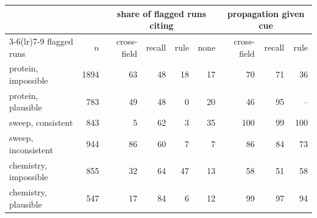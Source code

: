 \begin{tabular}{lrrrrrrrr}
\toprule
& & \multicolumn{4}{c}{share of flagged runs citing} & \multicolumn{3}{c}{propagation given cue} \\
\cmidrule(lr){3-6}\cmidrule(lr){7-9}
flagged runs & $n$ & cross-field & recall & rule & none & cross-field & recall & rule \\
\midrule
protein, impossible & 1894 & 63 & 48 & 18 & 17 & 70 & 71 & 36 \\
protein, plausible & 783 & 49 & 48 & 0 & 20 & 46 & 95 & -- \\
sweep, consistent & 843 & 5 & 62 & 3 & 35 & 100 & 99 & 100 \\
sweep, inconsistent & 944 & 86 & 60 & 7 & 7 & 86 & 84 & 73 \\
chemistry, impossible & 855 & 32 & 64 & 47 & 13 & 58 & 51 & 58 \\
chemistry, plausible & 547 & 17 & 84 & 6 & 12 & 99 & 97 & 94 \\
\bottomrule
\end{tabular}
